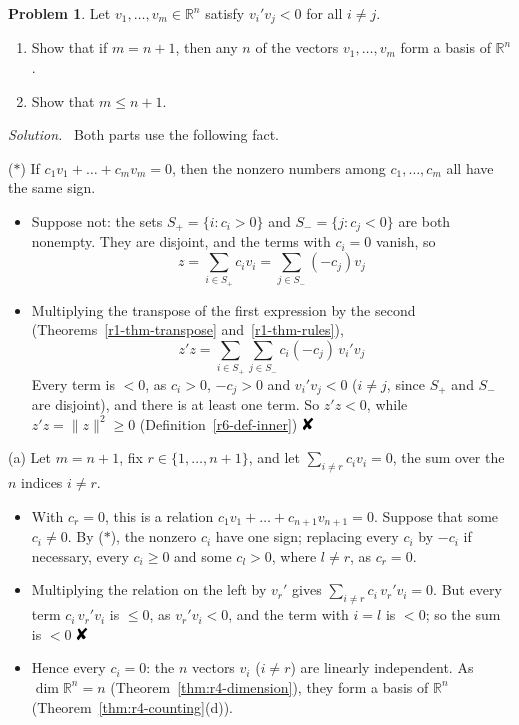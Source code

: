 \documentclass[12pt]{article}
\newcommand{\R}{\mathbb R}
\newcommand{\contradiction}{\mathord{\text{\large\ding{56}}}}
\theoremstyle{definition}
\newtheorem{problem}{Problem}
\newenvironment{solution}{\par\noindent\textit{Solution.}\ }{\par\smallskip}
\begin{document}
\begin{problem}\label{r6-ex-pr-negative-products}
Let \(v_1,\dots,v_m\in\R^n\) satisfy \(v_i'v_j<0\) for all \(i\ne j\).
\begin{enumerate}
\item Show that if \(m=n+1\), then any \(n\) of the vectors \(v_1,\dots,v_m\) form a basis of \(\R^n\).
\item Show that \(m\leqslant n+1\).
\end{enumerate}
\end{problem}
\begin{solution}
Both parts use the following fact.

(\(*\)) If \(c_1v_1+\dots+c_mv_m=0\), then the nonzero numbers among \(c_1,\dots,c_m\) all have the same sign.
\begin{itemize}
\item Suppose not: the sets \(S_+=\{i:c_i>0\}\) and \(S_-=\{j:c_j<0\}\) are both nonempty. They are disjoint, and the
terms with \(c_i=0\) vanish, so
\[
z=\sum_{i\in S_+}c_iv_i=\sum_{j\in S_-}(-c_j)v_j
\]
\item Multiplying the transpose of the first expression by the second (Theorems~\ref{r1-thm-transpose}
and~\ref{r1-thm-rules}),
\[
z'z=\sum_{i\in S_+}\sum_{j\in S_-}c_i(-c_j)\,v_i'v_j
\]
Every term is \(<0\), as \(c_i>0\), \(-c_j>0\) and \(v_i'v_j<0\) (\(i\ne j\), since \(S_+\) and \(S_-\) are disjoint), and
there is at least one term. So \(z'z<0\), while \(z'z=\lVert z\rVert^2\geqslant0\) (Definition~\ref{r6-def-inner})
\(\contradiction\)
\end{itemize}
(a) Let \(m=n+1\), fix \(r\in\{1,\dots,n+1\}\), and let \(\sum_{i\ne r}c_iv_i=0\), the sum over the \(n\) indices
\(i\ne r\).
\begin{itemize}
\item With \(c_r=0\), this is a relation \(c_1v_1+\dots+c_{n+1}v_{n+1}=0\). Suppose that some \(c_i\ne0\). By (\(*\)),
the nonzero \(c_i\) have one sign; replacing every \(c_i\) by \(-c_i\) if necessary, every \(c_i\geqslant0\) and some
\(c_l>0\), where \(l\ne r\), as \(c_r=0\).
\item Multiplying the relation on the left by \(v_r'\) gives \(\sum_{i\ne r}c_i\,v_r'v_i=0\). But every term
\(c_i\,v_r'v_i\) is \(\leqslant0\), as \(v_r'v_i<0\), and the term with \(i=l\) is \(<0\); so the sum is \(<0\)
\(\contradiction\)
\item Hence every \(c_i=0\): the \(n\) vectors \(v_i\) (\(i\ne r\)) are linearly independent. As \(\dim\R^n=n\)
(Theorem~\ref{thm:r4-dimension}), they form a basis of \(\R^n\) (Theorem~\ref{thm:r4-counting}(d)).

\end{itemize}
\end{solution}
\end{document}
